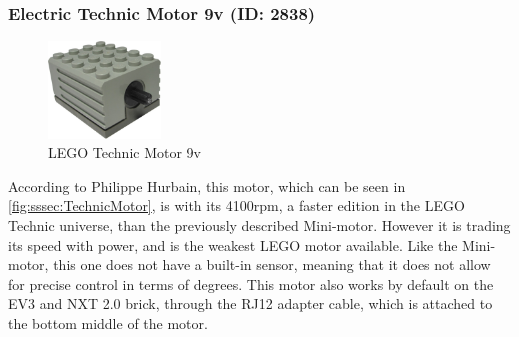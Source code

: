 \subsubsection{Electric Technic Motor 9v (ID: 2838)}
\begin{figure}[H]
  \centering
  \includegraphics[width=3cm]{images/techAnalysis/LegoTechnicMotor.jpg}
  \caption{LEGO Technic Motor 9v \cite{BrickOWl-figure-Technic-Motor9v}}\label{fig:sssec:TechnicMotor}
\end{figure}
According to Philippe Hurbain, this motor, which can be seen in \autoref{fig:sssec:TechnicMotor}, is with its 4100rpm, a faster edition in the LEGO Technic universe, than the previously described Mini-motor.
However it is trading its speed with power, and is the weakest LEGO motor available.
Like the Mini-motor, this one does not have a built-in sensor, meaning that it does not allow for precise control in terms of degrees.
This motor also works by default on the EV3 and NXT 2.0 brick, through the RJ12 adapter cable, which is attached to the bottom middle of the motor. \cite{hurbain_lego_technicmotorComp}
